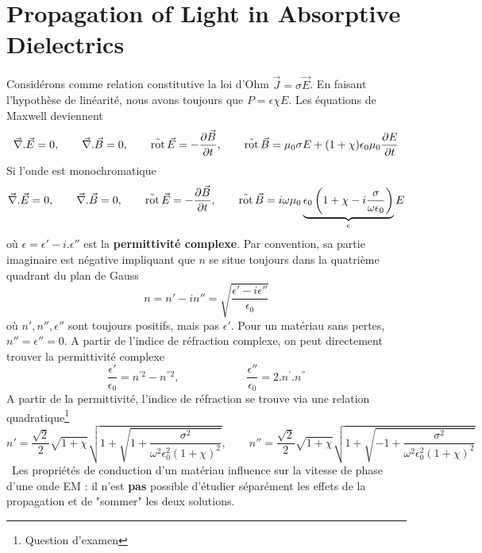 \section{Propagation of Light in Absorptive Dielectrics}
Considérons comme relation constitutive la loi d'Ohm $\vec{J} = \sigma\vec{E}$. En faisant l'hypothèse de 
linéarité, nous avons toujours que $P = \epsilon\chi E$. Les équations de Maxwell deviennent
\begin{equation}
\vec\nabla .\vec E = 0, \qquad\vec\nabla .\vec B = 0,\qquad \operatorname{\vec{rot}}\vec{E} = -\frac{\partial\vec{B}}{\partial t}, 
\qquad\operatorname{\vec{rot}}\vec{B} = \mu_0\sigma E + (1+\chi)\epsilon_0\mu_0\dfrac{\partial E}{\partial t}
\end{equation}
Si l'onde est monochromatique
\begin{equation}
\vec\nabla .\vec E = 0, \qquad\vec\nabla .\vec B = 0,\qquad \operatorname{\vec{rot}}\vec{E} = -\frac{\partial\vec{B}}{\partial t}, 
\qquad\operatorname{\vec{rot}}\vec{B} = i\omega\mu_0\underbrace{\epsilon_0\left(1+\chi-i\dfrac{\sigma}{\omega\epsilon_0}\right)}_{\epsilon}E
\end{equation}
où $\epsilon = \epsilon'-i.\epsilon''$ est la \textbf{permittivité complexe}. Par convention, sa partie imaginaire
est négative impliquant que $n$ se situe toujours dans la quatrième quadrant du plan de Gauss
\begin{equation}
n = n'-in'' = \sqrt{\dfrac{\epsilon'-i\epsilon''}{\epsilon_0}}
\end{equation}
où $n',n'',\epsilon''$ sont toujours positifs, mais pas $\epsilon'$. Pour un matériau sans pertes, $n''=\epsilon''=0$.
A partir de l'indice de réfraction complexe, on peut directement trouver la permittivité complexe
\begin{equation}
\dfrac{\epsilon'}{\epsilon_0} = n^{'2}-n^{''2},\qquad\qquad\qquad
\dfrac{\epsilon''}{\epsilon_0} = 2.n^{'}.n^{''}
\end{equation}
A partir de la permittivité, l'indice de réfraction se trouve via une relation quadratique\footnote{Question d'examen}
\begin{equation}
n' = \dfrac{\sqrt{2}}{2}\sqrt{1+\chi}\sqrt{1+\sqrt{1+\dfrac{\sigma^2}{\omega^2\epsilon_0^2(1+\chi)^2}}},
\qquad
n'' = \dfrac{\sqrt{2}}{2}\sqrt{1+\chi}\sqrt{1+\sqrt{-1+\dfrac{\sigma^2}{\omega^2\epsilon_0^2(1+\chi)^2}}}
\end{equation}
\danger\ Les propriétés de conduction d'un matériau influence sur la vitesse de phase d'une onde EM : 
il n'est \textbf{pas} possible d'étudier séparément les effets de la propagation et de "sommer" les 
deux solutions.\\

